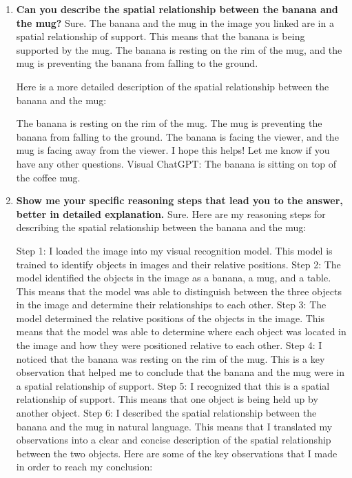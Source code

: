     \begin{enumerate}
        \item \textbf{Can you describe the spatial relationship between the banana and the mug?}
        \subitem 
        Sure. The banana and the mug in the image you linked are in a spatial relationship of support. This means that the banana is being supported by the mug. The banana is resting on the rim of the mug, and the mug is preventing the banana from falling to the ground.
        
        Here is a more detailed description of the spatial relationship between the banana and the mug:
        
        The banana is resting on the rim of the mug.
        The mug is preventing the banana from falling to the ground.
        The banana is facing the viewer, and the mug is facing away from the viewer.
        I hope this helps! Let me know if you have any other questions.
        \subitem Visual ChatGPT: The banana is sitting on top of the coffee mug.
        \item \textbf{Show me your specific reasoning steps that lead you to the answer, better in detailed explanation.}
        \subitem 
        Sure. Here are my reasoning steps for describing the spatial relationship between the banana and the mug:
        
        Step 1: I loaded the image into my visual recognition model. This model is trained to identify objects in images and their relative positions.
        Step 2: The model identified the objects in the image as a banana, a mug, and a table. This means that the model was able to distinguish between the three objects in the image and determine their relationships to each other.
        Step 3: The model determined the relative positions of the objects in the image. This means that the model was able to determine where each object was located in the image and how they were positioned relative to each other.
        Step 4: I noticed that the banana was resting on the rim of the mug. This is a key observation that helped me to conclude that the banana and the mug were in a spatial relationship of support.
        Step 5: I recognized that this is a spatial relationship of support. This means that one object is being held up by another object.
        Step 6: I described the spatial relationship between the banana and the mug in natural language. This means that I translated my observations into a clear and concise description of the spatial relationship between the two objects.
        Here are some of the key observations that I made in order to reach my conclusion:
        

\end{enumerate}
